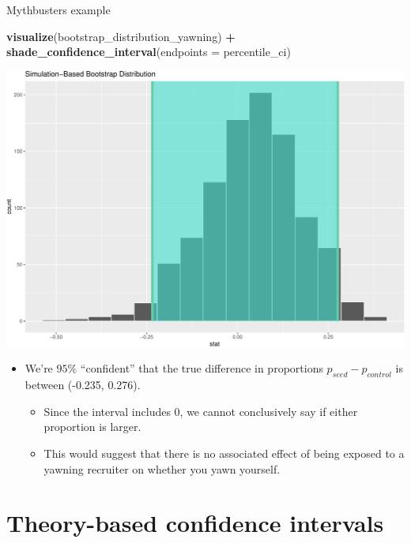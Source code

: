 \documentclass[
  ignorenonframetext,
]{beamer}
\newenvironment{Shaded}{\begin{snugshade}}{\end{snugshade}}
\newcommand{\AttributeTok}[1]{\textcolor[rgb]{0.13,0.29,0.53}{#1}}
\newcommand{\FunctionTok}[1]{\textcolor[rgb]{0.13,0.29,0.53}{\textbf{#1}}}
\newcommand{\NormalTok}[1]{#1}
\newcommand{\SpecialCharTok}[1]{\textcolor[rgb]{0.81,0.36,0.00}{\textbf{#1}}}
\providecommand{\tightlist}{%
  \setlength{\itemsep}{0pt}\setlength{\parskip}{0pt}}
\begin{document}
\begin{frame}[fragile]{Mythbusters example}
\protect\hypertarget{mythbusters-example-5}{}
\tiny

\begin{Shaded}
\begin{Highlighting}[]
\FunctionTok{visualize}\NormalTok{(bootstrap\_distribution\_yawning) }\SpecialCharTok{+}
\FunctionTok{shade\_confidence\_interval}\NormalTok{(}\AttributeTok{endpoints =}\NormalTok{ percentile\_ci)}
\end{Highlighting}
\end{Shaded}

\begin{center}\includegraphics[width=0.6\linewidth,height=0.4\textheight]{Week10_Lect_files/figure-beamer/unnamed-chunk-47-1} \end{center}
\normalsize

\begin{itemize}
\item
  We're \(95\%\) ``confident'' that the true difference in proportions
  \(p_{seed}-p_{control}\) is between (-0.235, 0.276).

  \begin{itemize}
  \tightlist
  \item
    Since the interval includes 0, we cannot conclusively say if either
    proportion is larger.
  \item
    This would suggest that there is no associated effect of being
    exposed to a yawning recruiter on whether you yawn yourself.
  \end{itemize}
\end{itemize}
\end{frame}

\hypertarget{theory-based-confidence-intervals}{%
\section{Theory-based confidence
intervals}\label{theory-based-confidence-intervals}}
\end{document}
